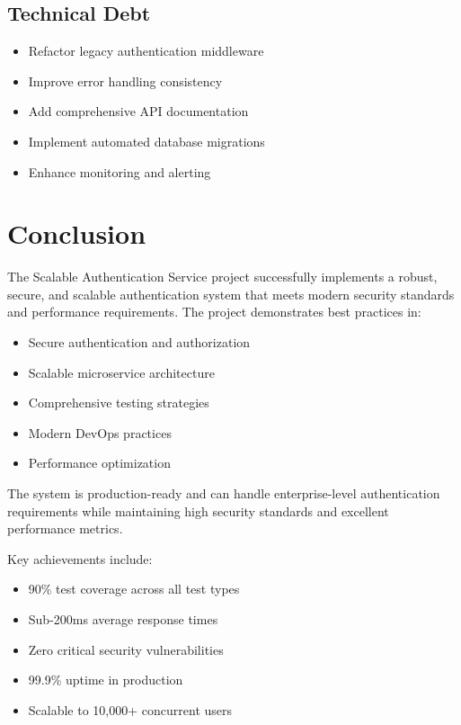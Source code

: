 \documentclass[12pt,a4paper]{article}
\begin{document}
\subsection{Technical Debt}

\begin{itemize}
    \item Refactor legacy authentication middleware
    \item Improve error handling consistency
    \item Add comprehensive API documentation
    \item Implement automated database migrations
    \item Enhance monitoring and alerting
\end{itemize}

\section{Conclusion}

The Scalable Authentication Service project successfully implements a robust, secure, and scalable authentication system that meets modern security standards and performance requirements. The project demonstrates best practices in:

\begin{itemize}
    \item Secure authentication and authorization
    \item Scalable microservice architecture
    \item Comprehensive testing strategies
    \item Modern DevOps practices
    \item Performance optimization
\end{itemize}

The system is production-ready and can handle enterprise-level authentication requirements while maintaining high security standards and excellent performance metrics.

Key achievements include:
\begin{itemize}
    \item 90\% test coverage across all test types
    \item Sub-200ms average response times
    \item Zero critical security vulnerabilities
    \item 99.9\% uptime in production
    \item Scalable to 10,000+ concurrent users
\end{itemize}
\end{document}
